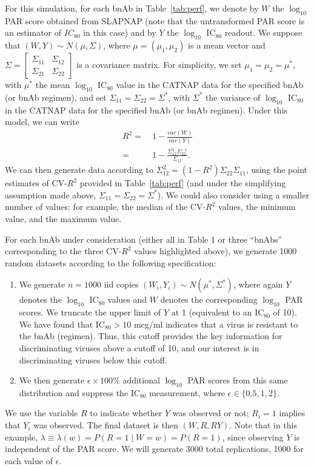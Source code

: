 \documentclass[10pt]{article}
\begin{document}
For this simulation, for each bnAb in Table~\ref{tab:perf}, we denote by $W$ the $\log_{10}$ PAR score obtained from SLAPNAP (note that the untransformed PAR score is an estimator of $IC_{80}$ in this case) and by $Y$ the $\log_{10}$ IC$_{80}$ readout. We suppose that $(W,Y) \sim N(\mu, \Sigma)$, where $\mu = (\mu_1, \mu_2)$ is a mean vector and $\Sigma = \begin{bmatrix} \Sigma_{11} & \Sigma_{12} \\ \Sigma_{21} & \Sigma_{22} \end{bmatrix}$ is a covariance matrix. For simplicity, we set $\mu_1 = \mu_2 = \mu^*$, with $\mu^*$ the mean $\log_{10}$ IC$_{80}$ value in the CATNAP data for the specified bnAb (or bnAb regimen), and set $\Sigma_{11} = \Sigma_{22} = \Sigma^*$, with $\Sigma^*$ the variance of $\log_{10}$ IC$_{80}$ in the CATNAP data for the specified bnAb (or bnAb regimen). Under this model, we can write
\begin{align*}
    R^2 =& \ 1 - \frac{var(W)}{var(Y)} \\
    =& \ 1 - \frac{\Sigma_{12}^2\Sigma_{22}^{-1}}{\Sigma_{11}}.
\end{align*}
We can then generate data according to $\Sigma_{12}^2 = (1 - R^2)\Sigma_{22}\Sigma_{11}$, using the point estimates of CV-$R^2$ provided in Table~\ref{tab:perf} (and under the simplifying assumption made above, $\Sigma_{11} = \Sigma_{22} = \Sigma^*$). We could also consider using a smaller number of values: for example, the median of the CV-$R^2$ values, the minimum value, and the maximum value.

For each bnAb under consideration (either all in Table 1 or three ``bnAbs'' corresponding to the three CV-$R^2$ values highlighted above), we generate 1000 random datasets according to the following specification:
\begin{enumerate}
    \item We generate $n = 1000$ iid copies $(W_i, Y_i) \sim N(\mu^*, \Sigma^*)$, where again $Y$ denotes the $\log_{10}$ IC$_{80}$ values and $W$ denotes the corresponding $\log_{10}$ PAR scores. We truncate the upper limit of $Y$ at 1 (equivalent to an IC$_{80}$ of 10). We have found that IC$_{80} > 10$ mcg/ml indicates that a virus is resistant to the bnAb (regimen). Thus, this cutoff provides the key information for discriminating viruses above a cutoff of 10, and our interest is in discriminating viruses below this cutoff.
    \item We then generate $\epsilon \times 100$\% additional $\log_{10}$ PAR scores from this same distribution and suppress the IC$_{80}$ measurement, where $\epsilon \in \{0.5, 1, 2\}$.
\end{enumerate}
We use the variable $R$ to indicate whether $Y$ was observed or not; $R_i = 1$ implies that $Y_i$ was observed. The final dataset is then $(W, R, RY)$. Note that in this example, $\lambda \equiv \lambda(w) = P(R = 1 \mid W = w) = P(R = 1)$, since observing $Y$ is independent of the PAR score. We will generate 3000 total replications, 1000 for each value of $\epsilon$.
\end{document}
